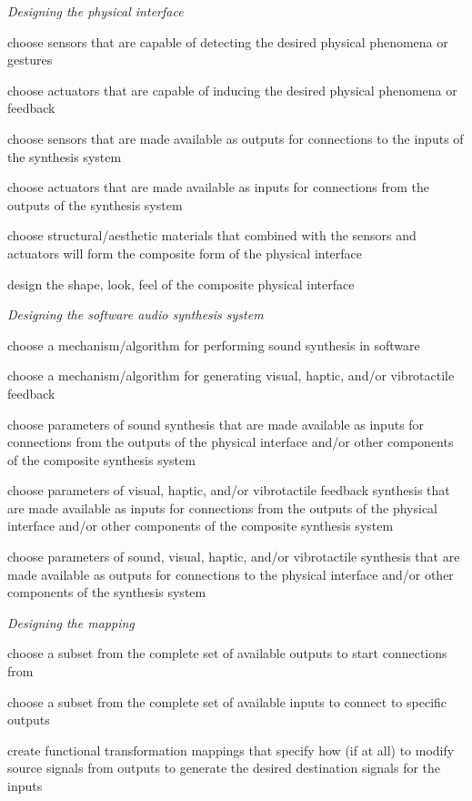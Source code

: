 \begin{description}
\item \emph{Designing the physical interface}
\begin{description}
\item choose sensors that are capable of detecting the desired physical phenomena or gestures
\item choose actuators that are capable of inducing the desired physical phenomena or feedback
\item choose sensors that are made available as outputs for connections to the inputs of the synthesis system
\item choose actuators that are made available as inputs for connections from the outputs of the synthesis system
\item choose structural/aesthetic materials that combined with the sensors and actuators will form the composite form of the physical interface
\item design the shape, look, feel of the composite physical interface
\end{description}
\item \emph{Designing the software audio synthesis system}
\begin{description}
\item choose a mechanism/algorithm for performing sound synthesis in software
\item choose a mechanism/algorithm for generating visual, haptic, and/or vibrotactile feedback
\item choose parameters of sound synthesis that are made available as inputs for connections from the outputs of the physical interface and/or other components of the composite synthesis system
\item choose parameters of visual, haptic, and/or vibrotactile feedback synthesis that are made available as inputs for connections from the outputs of the physical interface and/or other components of the composite synthesis system
\item choose parameters of sound, visual, haptic, and/or vibrotactile synthesis that are made available as outputs for connections to the physical interface and/or other components of the synthesis system
\end{description}
\item \emph{Designing the mapping}
\begin{description}
	\item choose a subset from the complete set of available outputs to start connections from
	\item choose a subset from the complete set of available inputs to connect to specific outputs
	\item create functional transformation mappings that specify how (if at all) to modify source signals from outputs to generate the desired destination signals for the inputs
\end{description}
\end{description}

